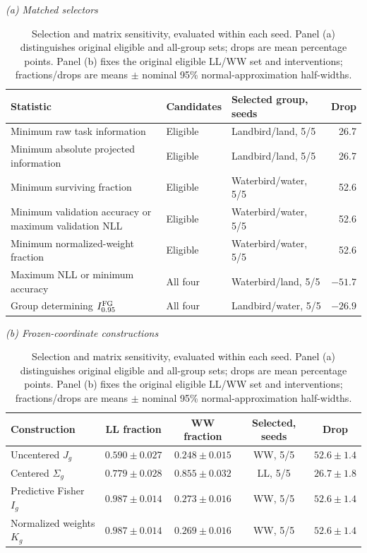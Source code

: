 \begin{table}[htbp]
\centering\small
\setlength{\tabcolsep}{3pt}
\caption{Selection and matrix sensitivity, evaluated within each seed. Panel (a) distinguishes original eligible and all-group sets; drops are mean percentage points. Panel (b) fixes the original eligible LL/WW set and interventions; fractions/drops are means $\pm$ nominal 95\% normal-approximation half-widths.}
\label{tab:d-selection-comparison}
\label{tab:d-matrix-sensitivity}
\textit{(a) Matched selectors}\par\smallskip
\begin{tabular}{@{}p{.39\linewidth}p{.13\linewidth}p{.30\linewidth}r@{}}
\toprule
Statistic & Candidates & Selected group, seeds & Drop \\
\midrule
Minimum raw task information & Eligible & Landbird/land, 5/5 & 26.7 \\
Minimum absolute projected information & Eligible & Landbird/land, 5/5 & 26.7 \\
Minimum surviving fraction & Eligible & Waterbird/water, 5/5 & 52.6 \\
Minimum validation accuracy or maximum validation NLL & Eligible & Waterbird/water, 5/5 & 52.6 \\
Minimum normalized-weight fraction & Eligible & Waterbird/water, 5/5 & 52.6 \\
Maximum NLL or minimum accuracy & All four & Waterbird/land, 5/5 & $-51.7$ \\
Group determining $I_{0.95}^{\mathrm{FG}}$ & All four & Landbird/water, 5/5 & $-26.9$ \\
\bottomrule
\end{tabular}
\par\smallskip
\textit{(b) Frozen-coordinate constructions}\par\smallskip
\begin{tabular}{@{}lcccc@{}}
\toprule
Construction & LL fraction & WW fraction & Selected, seeds & Drop \\
\midrule
Uncentered $J_g$ & $0.590\pm0.027$ & $0.248\pm0.015$ & WW, 5/5 & $52.6\pm1.4$ \\
Centered $\Sigma_g$ & $0.779\pm0.028$ & $0.855\pm0.032$ & LL, 5/5 & $26.7\pm1.8$ \\
Predictive Fisher $I_g$ & $0.987\pm0.014$ & $0.273\pm0.016$ & WW, 5/5 & $52.6\pm1.4$ \\
Normalized weights $K_g$ & $0.987\pm0.014$ & $0.269\pm0.016$ & WW, 5/5 & $52.6\pm1.4$ \\
\bottomrule
\end{tabular}
\par\smallskip
\end{table}

